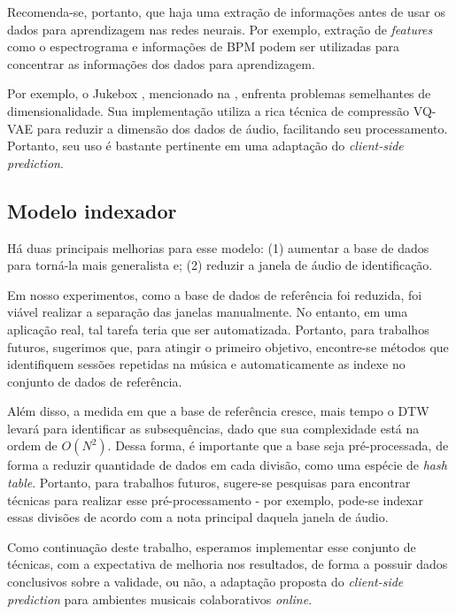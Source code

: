Recomenda-se, portanto, que haja uma extração de informações antes de usar os dados para aprendizagem nas redes neurais. Por exemplo, extração de \textit{features} como o espectrograma e informações de BPM podem ser utilizadas para concentrar as informações dos dados para aprendizagem.

Por exemplo, o Jukebox \cite{jukebox}, mencionado na , enfrenta problemas semelhantes de dimensionalidade. Sua implementação utiliza a rica técnica de compressão VQ-VAE \cite{vq-vae} para reduzir a dimensão dos dados de áudio, facilitando seu processamento. Portanto, seu uso é bastante pertinente em uma adaptação do \textit{client-side prediction}.

\subsection{Modelo indexador}

Há duas principais melhorias para esse modelo: (1) aumentar a base de dados para torná-la mais generalista e; (2) reduzir a janela de áudio de identificação.

Em nosso experimentos, como a base de dados de referência foi reduzida, foi viável realizar a separação das janelas manualmente. No entanto, em uma aplicação real, tal tarefa teria que ser automatizada. Portanto, para trabalhos futuros, sugerimos que, para atingir o primeiro objetivo, encontre-se métodos que identifiquem sessões repetidas na música e automaticamente as indexe no conjunto de dados de referência.

Além disso, a medida em que a base de referência cresce, mais tempo o DTW levará para identificar as subsequências, dado que sua complexidade está na ordem de $O(N^2)$. Dessa forma, é importante que a base seja pré-processada, de forma a reduzir quantidade de dados em cada divisão, como uma espécie de \textit{hash table}. Portanto, para trabalhos futuros, sugere-se pesquisas para encontrar técnicas para realizar esse pré-processamento - por exemplo, pode-se indexar essas divisões de acordo com a nota principal daquela janela de áudio.

Como continuação deste trabalho, esperamos implementar esse conjunto de técnicas, com a expectativa de melhoria nos resultados, de forma a possuir dados conclusivos sobre a validade, ou não, a adaptação proposta do \textit{client-side prediction} para ambientes musicais colaborativos \textit{online}.